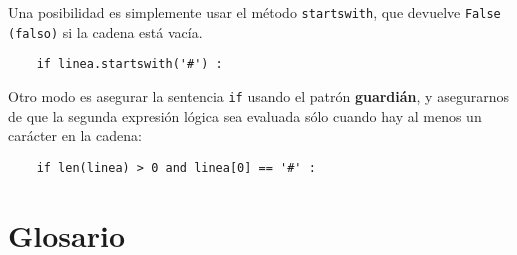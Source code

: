 Una posibilidad es simplemente usar el método {\tt startswith},
que devuelve {\tt False (falso)} si la cadena está vacía.

\beforeverb
\begin{verbatim}
    if linea.startswith('#') :
\end{verbatim}
\afterverb
%
Otro modo es asegurar la sentencia {\tt if} usando el patrón {\bf guardián},
y asegurarnos de que la segunda expresión lógica sea evaluada
sólo cuando hay al menos un carácter en la cadena:

\beforeverb
\begin{verbatim}
    if len(linea) > 0 and linea[0] == '#' :
\end{verbatim}
\afterverb
%

\section{Glosario}

